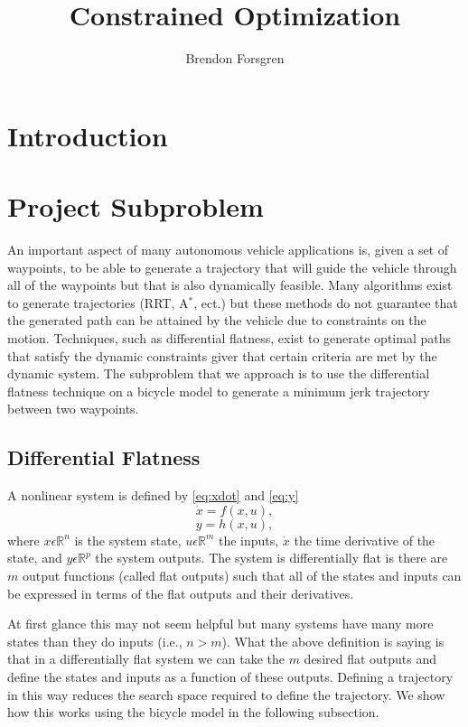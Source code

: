 \documentclass{article}
\begin{document}
\title{Constrained Optimization}
\author{Brendon Forsgren}
\maketitle

\section{Introduction}

\section{Project Subproblem}

An important aspect of many autonomous vehicle applications is, given a set of waypoints,
to be able to generate a trajectory that will guide the vehicle through all of the waypoints 
but that is also dynamically feasible. Many algorithms exist to generate trajectories
(RRT, A$^*$, ect.) but these methods do not guarantee that the generated path can be attained
by the vehicle due to constraints on the motion. Techniques, such as differential flatness,
exist to generate optimal paths that satisfy the dynamic constraints giver that certain criteria
are met by the dynamic system. The subproblem that we approach is to use the differential flatness 
technique on a bicycle model to generate a minimum jerk trajectory between two waypoints.

\subsection{Differential Flatness}
A nonlinear system is defined by \cref{eq:xdot} and \cref{eq:y}
\begin{equation}
  \dot{x} = f(x,u),
  \label{eq:xdot}
\end{equation}
\begin{equation}
  y = h(x,u),
  \label{eq:y}
\end{equation}
where $x \epsilon \mathbb{R}^n$ is the system state, $u \epsilon \mathbb{R}^m$ the inputs, $\dot{x}$ the time derivative of the state,
and $y \epsilon \mathbb{R}^p$ the system outputs. The system is differentially flat is there 
are $m$ output functions (called flat outputs) such that all of the states and inputs can be 
expressed in terms of the flat outputs and their derivatives.

At first glance this may not seem helpful but many systems have many more states than they do 
inputs (i.e., $n > m$). What the above definition is saying is that in a differentially flat
system we can take the $m$ desired flat outputs and define the states and inputs as a function 
of these outputs. Defining a trajectory in this way reduces the search space required to 
define the trajectory. We show how this works using the bicycle model in the following subsection.
\end{document}
